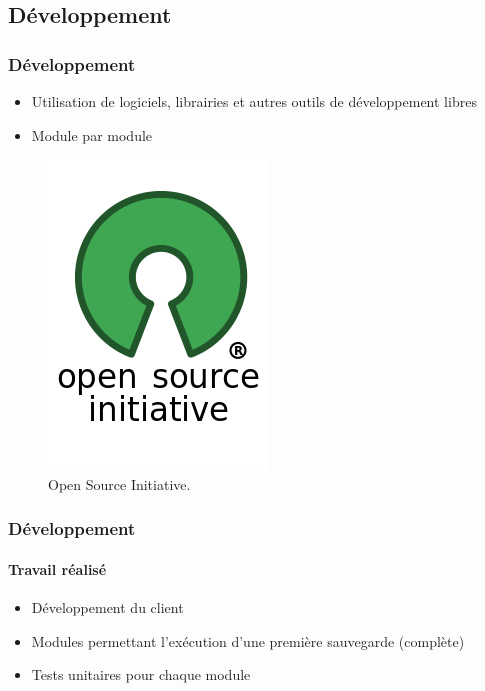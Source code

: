 \documentclass{beamer}
\begin{document}
\subsection{Développement}
\begin{frame}
 \frametitle{Développement}
 \begin{minipage}{0.49\textwidth}
  \begin{itemize}
    \item Utilisation de logiciels, librairies et autres outils de développement
    libres
    \item Module par module
  \end{itemize}
 \end{minipage}
 \begin{minipage}{0.49\textwidth}
   \begin{figure}[h!]
     \centering
     \includegraphics[scale=0.31]{presentation/logo_opensource.png}
     \caption{Open Source Initiative.}
   \end{figure}
 \end{minipage}
\end{frame}

\begin{frame}
 \frametitle{Développement}
 \framesubtitle{Travail réalisé}
 \begin{itemize}
  \item Développement du client
  \item Modules permettant l'exécution d'une première sauvegarde
  (complète)
  \item Tests unitaires pour chaque module
 \end{itemize}
\end{frame}
\end{document}
